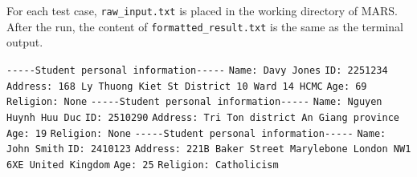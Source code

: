 For each test case, \texttt{raw\_input.txt} is placed in the working directory of
MARS. After the run, the content of \texttt{formatted\_result.txt} is the same as
the terminal output.

\begin{sloppypar}
%
  {\newline
  \texttt{-{}-{}-{}-{}-Student personal information-{}-{}-{}-{}-}\newline
  \texttt{Name: Davy Jones}\newline
  \texttt{ID: 2251234}\newline
  \texttt{Address: 168 Ly Thuong Kiet St District 10 Ward 14 HCMC}\newline
  \texttt{Age: 69}\newline
  \texttt{Religion: None}}
%
  {\newline
  \texttt{-{}-{}-{}-{}-Student personal information-{}-{}-{}-{}-}\newline
  \texttt{Name: Nguyen Huynh Huu Duc}\newline
  \texttt{ID: 2510290}\newline
  \texttt{Address: Tri Ton district An Giang province}\newline
  \texttt{Age: 19}\newline
  \texttt{Religion: None}}
%
  {\newline
  \texttt{-{}-{}-{}-{}-Student personal information-{}-{}-{}-{}-}\newline
  \texttt{Name: John Smith}\newline
  \texttt{ID: 2410123}\newline
  \texttt{Address: 221B Baker Street Marylebone London NW1 6XE United Kingdom}\newline
  \texttt{Age: 25}\newline
  \texttt{Religion: Catholicism}}
\end{sloppypar}
